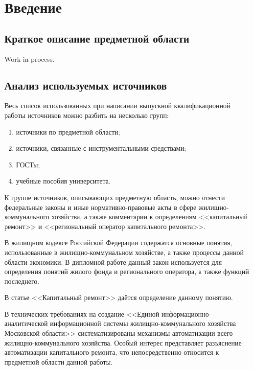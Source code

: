 \section*{Введение}

\subsection{Краткое описание предметной области}

Work in process.

\subsection{Анализ используемых источников}

Весь список использованных при написании выпускной квалификационной работы источников можно разбить на несколько групп:

\begin{enumerate}
	\item источники по предметной области;
	\item источники, связанные с инструментальными средствами;
	\item ГОСТы;
	\item учебные пособия университета.
\end{enumerate}

К группе источников, описывающих предметную область, можно отнести федеральные законы и иные нормативно-правовые акты в сфере жилищно-коммунального хозяйства, а также комментарии к определениям <<капитальный ремонт>> и <<региональный оператор капитального ремонта>>.

В жилищном кодексе Российской Федерации содержатся основные понятия, использованные в жилищно-коммунальном хозяйстве, а также процессы данной области экономики.
В дипломной работе данный закон используется для определения понятий жилого фонда и регионального оператора, а также функций последнего.

В статье <<Капитальный ремонт>> даётся определение данному понятию.

В технических требованиях на создание <<Единой информационно-аналитической информационной системы жилищно-коммунального хозяйства Московской области>> систематизированы механизмы автоматизации всего жилищно-коммунального хозяйства.
Особый интерес представляет разъяснение автоматизации капитального ремонта, что непосредственно относится к предметной области данной работы.

